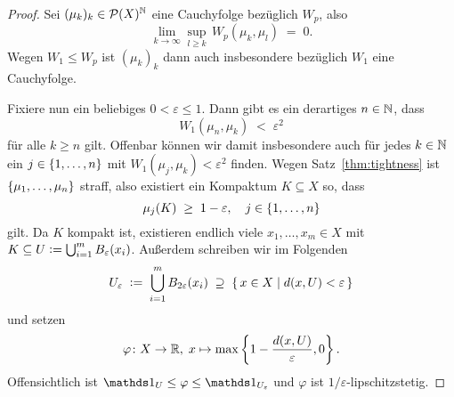 \documentclass[../main/main.tex]{subfiles}
\begin{document}
	\begin{proof}
		Sei $(\mu_k)_k \in \mathcal{P}(X)^{\mathbb{N}}$ eine Cauchyfolge bezüglich $W_p$, also
		\[ \lim_{k \to \infty} \sup_{l \geq k} \, W_p(\mu_k, \mu_l) \; = \; 0 \text{.} \]
		Wegen $W_1 \leq W_p$ ist $(\mu_k)_k$ dann auch insbesondere bezüglich $W_1$ eine Cauchyfolge. 
		
		Fixiere nun ein beliebiges $0 < \varepsilon \leq 1$. Dann gibt es ein derartiges $n \in \mathbb{N}$, dass 
		\[ W_1(\mu_n, \mu_k) \; < \; \varepsilon^2 \]
		für alle $k \geq n$ gilt. Offenbar können wir damit insbesondere auch für jedes $k \in \mathbb{N}$ ein $j \in \left\{1, \dots, n\right\}$ mit
		$W_1(\mu_j, \mu_k) < \varepsilon^2$ finden. Wegen Satz~\ref{thm:tightness} ist $\left\{\mu_1, \dots, \mu_n\right\}$ straff, also existiert ein Kompaktum
		$K \subseteq X$ so, dass
		\[ \mu_j(K) \; \geq \; 1 - \varepsilon, \quad j \in \left\{1, \dots, n\right\} \]
		gilt. Da $K$ kompakt ist, existieren endlich viele $x_1, \dots, x_m \in X$ mit 
		$K \subseteq U \vcentcolon = \bigcup_{i=1}^{m} B_{\varepsilon}(x_i)$.
		Außerdem schreiben wir im Folgenden 
		\[ U_{\varepsilon} \; \vcentcolon = \; \bigcup_{i=1}^{m} B_{2\varepsilon}(x_i) \; \supseteq \; \left\{\, x \in X \; \middle| \; d(x, U) < \varepsilon \,\right\} \] 
		und setzen 
		\[ \varphi \colon X \to \mathbb{R}, \; x \mapsto \max \left\{1-\frac{d(x, U)}{\varepsilon}, 0 \right\}  \text{.} \]
		Offensichtlich ist $\indfct_U \leq \varphi \leq \indfct_{U_\varepsilon}$ und $\varphi$ ist $1/\varepsilon$-lipschitzstetig.
		

\end{proof}
\end{document}
